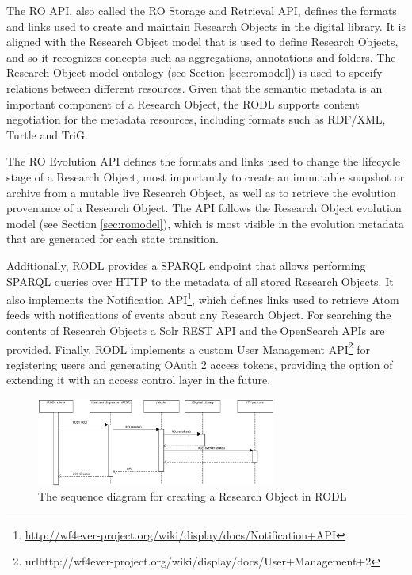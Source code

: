 The RO API, also called the RO Storage and Retrieval API, defines the formats and links used to create and maintain Research Objects in the digital library. It is aligned with the Research Object model that is used to define Research Objects, and so it recognizes concepts such as aggregations, annotations and folders. The Research Object model ontology (see Section \ref{sec:romodel}) is used to specify relations between different resources. Given that the semantic metadata is an important component of a Research Object, the RODL supports content negotiation for the metadata resources, including formats such as RDF/XML, Turtle and TriG.

The RO Evolution API defines the formats and links used to change the lifecycle stage of a Research Object, most importantly to create an immutable snapshot or archive from a mutable live Research Object, as well as to retrieve the evolution provenance of a Research Object. The API follows the Research Object evolution model (see Section \ref{sec:romodel}), which is most visible in the evolution metadata that are generated for each state transition.

Additionally, RODL provides a SPARQL endpoint that allows performing SPARQL queries over HTTP to the metadata of all stored Research Objects. It also implements the Notification API\footnote{\url{http://wf4ever-project.org/wiki/display/docs/Notification+API}}, which defines links used to retrieve Atom feeds with notifications of events about any Research Object. For searching the contents of Research Objects a Solr REST API and the OpenSearch APIs are provided. Finally, RODL implements a custom User Management API\footnote{url{http://wf4ever-project.org/wiki/display/docs/User+Management+2}} for registering users and generating OAuth 2 access tokens, providing the option of extending it with an access control layer in the future.


\begin{figure}[!h]
\centering
\includegraphics[width=0.7\textwidth]{Figures/RODL/ROcreate.png}
\caption{The sequence diagram for creating a Research Object in RODL}
\label{ROCreate}
\end{figure}

